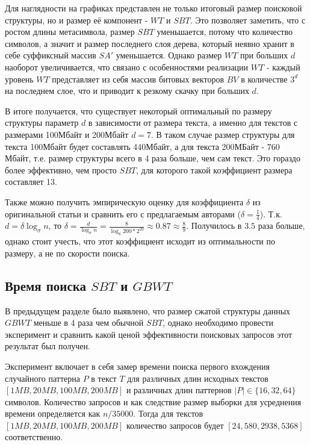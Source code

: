 \documentclass[a4paper,12pt]{article}
\begin{document}
\newpage

Для наглядности на графиках представлен не только итоговый размер поисковой структуры, но и размер её компонент - $WT$ и $SBT$. Это позволяет заметить, что с ростом длины метасимвола, размер $SBT$ уменьшается, потому что количество символов, а значит и размер последнего слоя дерева, который неявно хранит в себе суффиксный массив $SA'$ уменьшается. Однако размер $WT$ при больших $d$ наоборот увеличивается, что связано с особенностями реализации $WT$ - каждый уровень $WT$ представляет из себя массив битовых векторов $BV$ в количестве $3^d$ на последнем слое, что и приводит к резкому скачку при больших $d$.

В итоге получается, что существует некоторый оптимальный по размеру структуры параметр $d$ в зависимости от размера текста, а именно для текстов с размерами 100Мбайт и 200Мбайт $d = 7$. В таком случае размер структуры для текста 100Мбайт будет составлять 440Мбайт, а для текста 200МБайт - 760 Мбайт, т.е. размер структуры всего в 4 раза больше, чем сам текст. Это гораздо более эффективно, чем просто $SBT$, для которого такой коэффициент размера составляет 13.

Также можно получить эмпирическую оценку для коэффициента $\delta$ из оригинальной статьи и сравнить его с предлагаемым авторами ($\delta = \frac{1}{4}$). Т.к. $d = \delta \log_{\sigma}{n}$, то $\delta = \frac{d}{\log_{\sigma}{n}} = \frac{8}{\log_{8}{200 * 2 ^ {20}}} \approx 0.87 \approx \frac{8}{9}$. Получилось в $3.5$ раза больше, однако стоит учесть, что этот коэффициент исходит из оптимальности по размеру, а не по скорости поиска.

\subsection{Время поиска $SBT$ и $GBWT$}
В предыдущем разделе было выявлено, что размер сжатой структуры данных $GBWT$ меньше в 4 раза чем обычной $SBT$, однако необходимо провести эксперимент и сравнить какой ценой эффективности поисковых запросов этот результат был получен.

Эксперимент включает в себя замер времени поиска первого вхождения случайного паттерна $P$ в текст $T$ для различных длин исходных текстов $[1MB, 20MB, 100MB, 200MB]$ и различных длин паттернов $|P| \in \{16, 32, 64\}$ символов. Количество запросов и как следствие размер выборки для усреднения времени определяется как $n / 35000$. Тогда для текстов $[1MB, 20MB, 100MB, 200MB]$ количество запросов будет $[24, 580, 2938, 5368]$ соответственно.
\end{document}
